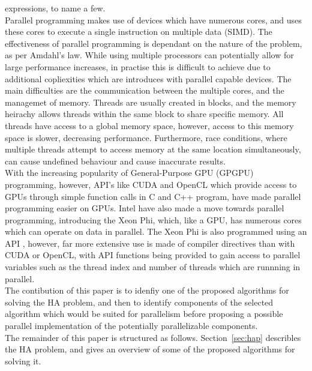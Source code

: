 \documentclass[10pt,twocolumn]{witseiepaper}
\begin{document}
expressions, to name a few. \\
Parallel programming makes use of devices which have numerous cores, and uses these cores to execute a single
instruction on multiple data (SIMD). The effectiveness of parallel programming is dependant on the nature of 
the problem, as per Amdahl's law. While using multiple processors can potentially allow for large performance 
increases, in practise this is difficult to achieve due to additional copliexities which are introduces with 
parallel capable devices. The main difficulties are the communication between the multiple cores, and the 
managemet of memory. Threads are usually created in blocks, and the memory heirachy allows threads within the 
same block to share specific memory. All threads have access to a global memory space, however, access to this 
memory space is slower, decreasing performance. Furthermore, race conditions, where multiple threads attempt to 
access memory at the same location simultaneously, can cause undefined behaviour and cause inaccurate results. \\
With the increasing popularity of General-Purpose GPU (GPGPU) programming, however, API's like CUDA
\cite{nvidia:2015} and OpenCL \cite{khronos:2015}
which provide access to GPUs through simple function calls in C and C++ program, have made parallel programming
easier on GPUs. Intel have also made a move towards parallel programming, introducing the Xeon Phi, which, like 
a GPU, has numerous cores which can operate on data in parallel. The Xeon Phi is also programmed using an API 
\cite{intel:2013}, however, far more extensive use is made of compiler directives than with CUDA or OpenCL, 
with API functions being provided to gain access to parallel variables such as the thread index and number of 
threads which are runnning in parallel. \\
The contibution of this paper is to idenfiy one of the proposed algorithms for solving the HA problem, and then 
to identify components of the selected algorithm which would be suited for parallelism before proposing a 
possible parallel implementation of the potentially parallelizable components. \\
The remainder of this paper is structured as follows. Section~\ref{sec:hap} describles the HA problem, and gives 
an overview of some of the proposed algorithms for solving it.  


\end{document}
